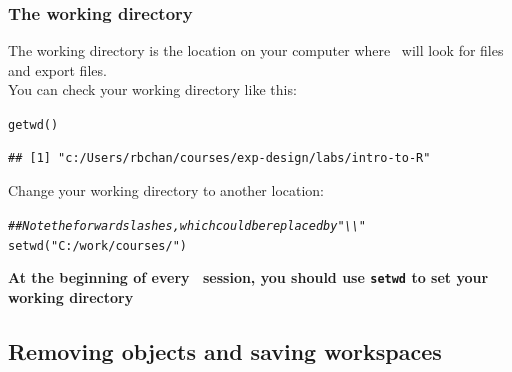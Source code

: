 \documentclass[color=usenames,dvipsnames]{beamer}\usepackage[]{graphicx}\usepackage[]{color}
\makeatletter
\newcommand{\hlstr}[1]{\textcolor[rgb]{0.749,0.012,0.012}{#1}}%
\newcommand{\hlcom}[1]{\textcolor[rgb]{0.514,0.506,0.514}{\textit{#1}}}%
\newcommand{\hlstd}[1]{\textcolor[rgb]{0,0,0}{#1}}%
\newcommand{\hlkwd}[1]{\textcolor[rgb]{0.004,0.004,0.506}{#1}}%
\newenvironment{kframe}{%
 \def\at@end@of@kframe{}%
 \ifinner\ifhmode%
  \def\at@end@of@kframe{\end{minipage}}%
  \begin{minipage}{\columnwidth}%
 \fi\fi%
 \def\FrameCommand##1{\hskip\@totalleftmargin \hskip-\fboxsep
 \colorbox{shadecolor}{##1}\hskip-\fboxsep
     \hskip-\linewidth \hskip-\@totalleftmargin \hskip\columnwidth}%
 \MakeFramed {\advance\hsize-\width
   \@totalleftmargin\z@ \linewidth\hsize
   \@setminipage}}%
 {\par\unskip\endMakeFramed%
 \at@end@of@kframe}
\newenvironment{knitrout}{}{} %
\newcommand{\inr}[1]{\colorbox{inlinecolor}{\texttt{#1}}}
\makeatother
\begin{document}
\begin{frame}[fragile]
  \frametitle{The working directory}
The working directory is the location on your computer where \R~will
look for files and export files. \\
\pause \vfill
You can check your working directory like this:
\begin{knitrout}\small
{}\color{fgcolor}\begin{kframe}
\begin{alltt}
\hlkwd{getwd}\hlstd{()}
\end{alltt}
\begin{verbatim}
## [1] "c:/Users/rbchan/courses/exp-design/labs/intro-to-R"
\end{verbatim}
\end{kframe}
\end{knitrout}
\pause \vfill
Change your working directory to another location:
\begin{knitrout}\small
{}\color{fgcolor}\begin{kframe}
\begin{alltt}
\hlcom{## Note the forward slashes, which could be replaced by "\textbackslash{}\textbackslash{}"}
\hlkwd{setwd}\hlstd{(}\hlstr{"C:/work/courses/"}\hlstd{)}
\end{alltt}
\end{kframe}
\end{knitrout}
\pause \vfill
\centering
{\bf At the beginning of every \R~session, you should use
  \inr{setwd} to set your working directory \\}
\end{frame}








\subsection{Removing objects and saving workspaces}
\end{document}
